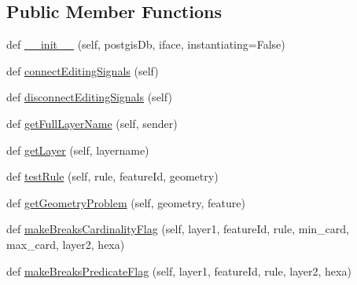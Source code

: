 \subsection*{Public Member Functions}
\begin{DoxyCompactItemize}
\item 
def \mbox{\hyperlink{class_dsg_tools_1_1_validation_tools_1_1_validation_processes_1_1spatial_rule_enforcer_1_1_spatial_rule_enforcer_a0f002e320a95a131a1211e09b01e002b}{\+\_\+\+\_\+init\+\_\+\+\_\+}} (self, postgis\+Db, iface, instantiating=False)
\item 
def \mbox{\hyperlink{class_dsg_tools_1_1_validation_tools_1_1_validation_processes_1_1spatial_rule_enforcer_1_1_spatial_rule_enforcer_a2fb050cd13e6db3674abc510ed7a0f5d}{connect\+Editing\+Signals}} (self)
\item 
def \mbox{\hyperlink{class_dsg_tools_1_1_validation_tools_1_1_validation_processes_1_1spatial_rule_enforcer_1_1_spatial_rule_enforcer_ab1b671b986a90646fc822751bf7f3323}{disconnect\+Editing\+Signals}} (self)
\item 
def \mbox{\hyperlink{class_dsg_tools_1_1_validation_tools_1_1_validation_processes_1_1spatial_rule_enforcer_1_1_spatial_rule_enforcer_ad880eac8b230f8f6c2cf43e282459544}{get\+Full\+Layer\+Name}} (self, sender)
\item 
def \mbox{\hyperlink{class_dsg_tools_1_1_validation_tools_1_1_validation_processes_1_1spatial_rule_enforcer_1_1_spatial_rule_enforcer_afa2ba2a249fc1aa3b5418f6490438b2d}{get\+Layer}} (self, layername)
\item 
def \mbox{\hyperlink{class_dsg_tools_1_1_validation_tools_1_1_validation_processes_1_1spatial_rule_enforcer_1_1_spatial_rule_enforcer_a22b1704cb8ae1140b03a0f0377f180d4}{test\+Rule}} (self, rule, feature\+Id, geometry)
\item 
def \mbox{\hyperlink{class_dsg_tools_1_1_validation_tools_1_1_validation_processes_1_1spatial_rule_enforcer_1_1_spatial_rule_enforcer_a6a2a7d38c1dba08a2f3f8a8acf3c7da6}{get\+Geometry\+Problem}} (self, geometry, feature)
\item 
def \mbox{\hyperlink{class_dsg_tools_1_1_validation_tools_1_1_validation_processes_1_1spatial_rule_enforcer_1_1_spatial_rule_enforcer_ae6529d8b4ac153e4bf0082d18b886560}{make\+Breaks\+Cardinality\+Flag}} (self, layer1, feature\+Id, rule, min\+\_\+card, max\+\_\+card, layer2, hexa)
\item 
def \mbox{\hyperlink{class_dsg_tools_1_1_validation_tools_1_1_validation_processes_1_1spatial_rule_enforcer_1_1_spatial_rule_enforcer_af5826fc69a3252c80d07579c23c14c32}{make\+Breaks\+Predicate\+Flag}} (self, layer1, feature\+Id, rule, layer2, hexa)

\end{DoxyCompactItemize}
